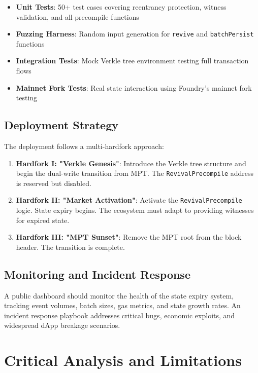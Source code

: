 \documentclass{article}
\begin{document}
\begin{itemize}
\item \textbf{Unit Tests}: 50+ test cases covering reentrancy protection, witness validation, and all precompile functions
\item \textbf{Fuzzing Harness}: Random input generation for \texttt{revive} and \texttt{batchPersist} functions
\item \textbf{Integration Tests}: Mock Verkle tree environment testing full transaction flows
\item \textbf{Mainnet Fork Tests}: Real state interaction using Foundry's mainnet fork testing
\end{itemize}

\subsection{Deployment Strategy}

The deployment follows a multi-hardfork approach:

\begin{enumerate}
\item \textbf{Hardfork I: "Verkle Genesis"}: Introduce the Verkle tree structure and begin the dual-write transition from MPT. The \texttt{RevivalPrecompile} address is reserved but disabled.
\item \textbf{Hardfork II: "Market Activation"}: Activate the \texttt{RevivalPrecompile} logic. State expiry begins. The ecosystem must adapt to providing witnesses for expired state.
\item \textbf{Hardfork III: "MPT Sunset"}: Remove the MPT root from the block header. The transition is complete.
\end{enumerate}

\subsection{Monitoring and Incident Response}

A public dashboard should monitor the health of the state expiry system, tracking event volumes, batch sizes, gas metrics, and state growth rates. An incident response playbook addresses critical bugs, economic exploits, and widespread dApp breakage scenarios.

\section{Critical Analysis and Limitations}
\end{document}

